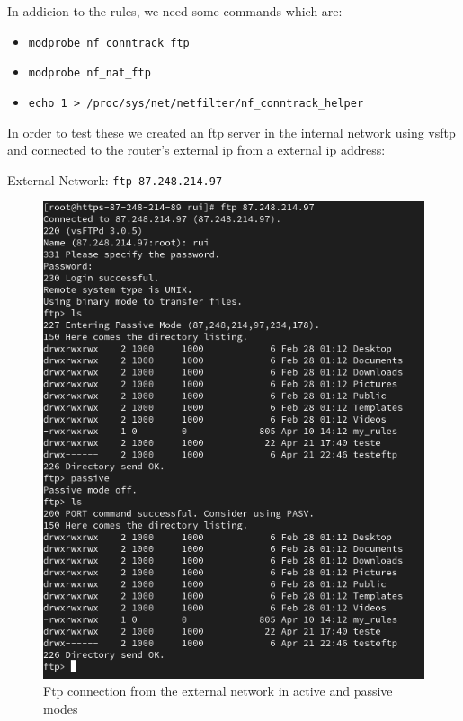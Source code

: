 \documentclass{article}
\begin{document}
In addicion to the rules, we need some commands which are:
\begin{itemize}
    \item \texttt{modprobe nf_conntrack_ftp}
    \item \texttt{modprobe nf_nat_ftp}
    \item \texttt{echo 1 > /proc/sys/net/netfilter/nf_conntrack_helper}
\end{itemize}

In order to test these we created an ftp server in the internal network using vsftp and connected to the router's external ip from a external ip address:
\texttt{}\par
\texttt{}\par
External Network: \texttt{ftp 87.248.214.97} \par
\texttt{}\par
\begin{figure}[H]
    \centering
    \includegraphics[scale=0.5]{out/out_ftp.png}
    \caption{Ftp connection from the external network in active and passive modes}
    \label{fig:network-arc}
\end{figure}
\end{document}
